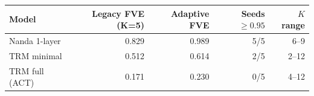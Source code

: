 \begin{tabular}{lrrrr}
\toprule
Model & Legacy FVE (K=5) & Adaptive FVE & Seeds $\geq 0.95$ & $K$ range \\
\midrule
Nanda 1-layer & 0.829 & 0.989 & 5/5 & 6--9 \\
TRM minimal & 0.512 & 0.614 & 2/5 & 2--12 \\
TRM full (ACT) & 0.171 & 0.230 & 0/5 & 4--12 \\
\bottomrule
\end{tabular}
